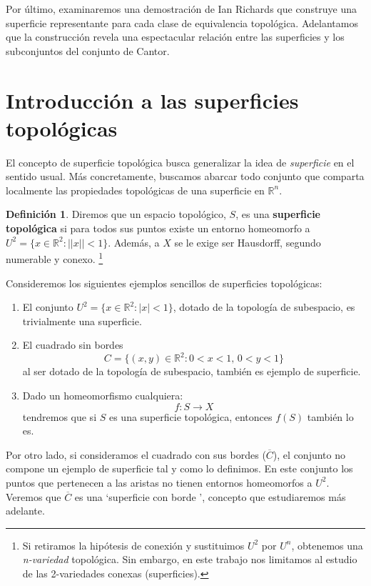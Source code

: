\documentclass[a4paper,11pt,spanish, twoside, leqno]{tfg-uam}
\theoremstyle{definition}
\newtheorem{defin}[teor]{Definici\'on}
\begin{document}
  Por último, examinaremos una demostración de Ian Richards \cite{ian} que  construye una superficie representante para cada clase de equivalencia topológica. Adelantamos que la construcción revela una espectacular relación entre las superficies y los subconjuntos del conjunto de Cantor.

\section{Introducci\'on a las superficies topológicas}


El concepto de superficie topológica busca generalizar la idea de \textit{superficie} en el sentido usual. Más concretamente, buscamos abarcar todo conjunto que comparta localmente las propiedades topológicas de una superficie en $\mathbb{R}^n$. 

\begin{defin}
	Diremos que un espacio topológico, $S$, es una \textbf{superficie topológica} si para todos sus puntos existe un entorno homeomorfo a $U^2 = \{x\in \mathbb{R}^2: ||x||<1 \}$. Además, a $X$ se le exige ser Hausdorff, segundo numerable y conexo. \footnote{Si retiramos la hipótesis de conexión y sustituimos $U^2$ por $U^n$, obtenemos una \textit{n-variedad} topológica. Sin embargo, en este trabajo nos limitamos al estudio de las 2-variedades conexas (superficies).}
\end{defin}

Consideremos los siguientes ejemplos sencillos de superficies topológicas:
\begin{enumerate}
	\item El conjunto $ U^2 = \{ x\in\mathbb{R}^2: |x|<1 \} $, dotado de la topología de subespacio, es trivialmente una superficie. 
	\item El cuadrado sin bordes
	\[
	C = \{(x,y)\in \mathbb{R}^2: 0 <  x < 1,\, 0 < y < 1 \}
	\]
	al ser dotado de la topología de subespacio, también es ejemplo de superficie.
	\item Dado un homeomorfismo cualquiera:
	\[
	f:S \rightarrow X
	\]
	tendremos que si $S$ es una superficie topológica, entonces $f(S)$ también lo es.
\end{enumerate}

Por otro lado, si consideramos el cuadrado con sus bordes ($\overline{C}$), el conjunto no compone un ejemplo de superficie tal y como lo definimos. En este conjunto los puntos que pertenecen a las aristas no tienen entornos homeomorfos a $U^2$. Veremos que $\overline{C}$ es una \textquoteleft superficie con borde \textquoteright, concepto que estudiaremos más adelante.
\end{document}
